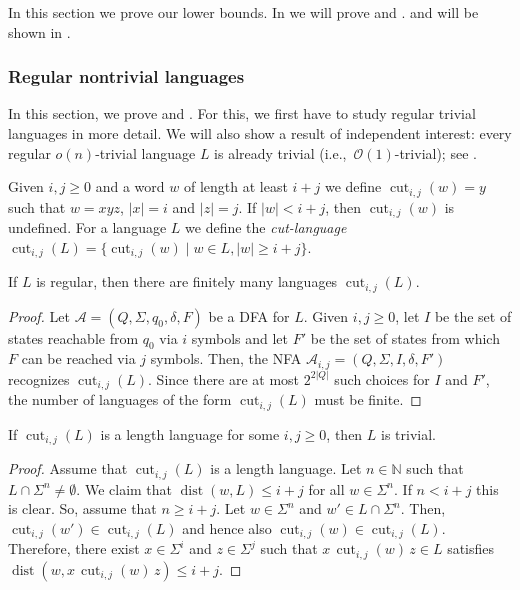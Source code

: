 \documentclass{article}\usepackage[a4paper,margin=20mm]{geometry}
\newcommand{\N}{\mathbb{N}}
\newcommand{\A}{\mathcal{A}}
\renewcommand{\O}{\mathcal{O}}
\DeclareMathOperator{\dist}{dist}
\DeclareMathOperator{\cut}{cut}
\renewcommand{\geq}{\geqslant}
\renewcommand{\leq}{\leqslant}
\renewcommand{\ge}{\geq}
\renewcommand{\le}{\leq}
\begin{document}
In this section we prove our lower bounds. In  we will prove   and .
 and  will be shown in .



\subsubsection{Regular nontrivial  languages} \label{sec-lb-nontriv}

In this section, we prove  and .
For this, we first have to study regular trivial languages in more detail.
We will also show a result of independent interest: every regular $o(n)$-trivial language $L$ is already trivial (i.e.,~$\O(1)$-trivial); see .

Given $i,j \ge 0$ and a word $w$ of length at least $i+j$ we define
$\cut_{i,j}(w) = y$ such that $w = xyz$, $|x| = i$ and $|z| = j$.
If $|w| < i+j$, then $\cut_{i,j}(w)$ is undefined.
For a language $L$ we define the {\em cut-language} $\cut_{i,j}(L) = \{ \cut_{i,j}(w) \mid w \in L, |w| \ge i+j \}$.

\begin{lemma} \label{lemma-fin-cut-lang}
	If $L$ is regular, then there are finitely many languages $\cut_{i,j}(L)$.
\end{lemma}

\begin{proof}
Let $\A = (Q,\Sigma,q_0,\delta,F)$ be a DFA for $L$.
Given $i,j \ge 0$, let $I$ be the set of states reachable from $q_0$ via $i$ symbols
and let $F'$ be the set of states from which $F$ can be reached via $j$ symbols.
Then, the NFA $\A_{i,j} = (Q,\Sigma,I,\delta,F')$ recognizes $\cut_{i,j}(L)$.
Since there are at most $2^{2|Q|}$ such choices for $I$ and $F'$,
the number of languages of the form $\cut_{i,j}(L)$ must be finite.
\end{proof}

\begin{lemma} \label{cuts}
	If $\cut_{i,j}(L)$ is a length language for some $i,j \ge 0$, then $L$ is trivial.
\end{lemma}

\begin{proof}
	Assume that $\cut_{i,j}(L)$ is a length language.
	Let $n \in \N$ such that $L \cap \Sigma^n \neq \emptyset$.
	We claim that $\dist(w,L) \le i+j$ for all $w \in \Sigma^n$. If $n < i+j$ this is clear.
	So, assume that  $n \ge i+j$. 
	Let $w \in \Sigma^n$ and $w' \in L \cap \Sigma^n$. Then, $\cut_{i,j}(w') \in \cut_{i,j}(L)$
	and hence also $\cut_{i,j}(w) \in \cut_{i,j}(L)$.
	Therefore, there exist $x \in \Sigma^i$ and $z \in \Sigma^j$ such that $x \, \cut_{i,j}(w) \, z \in L$
	satisfies $\dist(w, x \, \cut_{i,j}(w) \, z) \le i+j$.
\end{proof}
\end{document}
